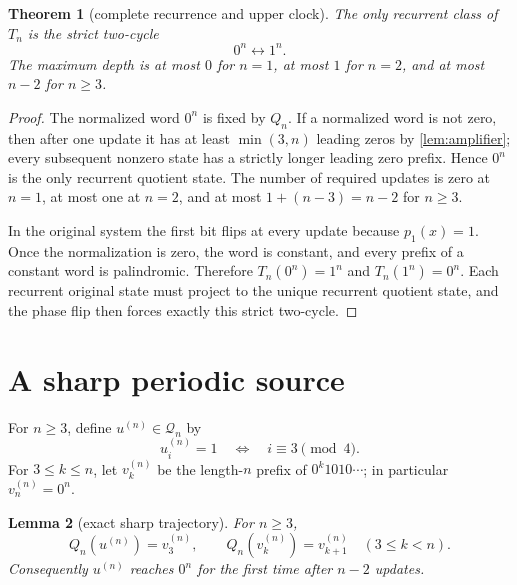 \documentclass[10pt,a4paper]{amsart}
\newtheorem{theorem}{Theorem}[section]
\newtheorem{lemma}[theorem]{Lemma}
\theoremstyle{definition}
\theoremstyle{remark}
\begin{document}
\begin{theorem}[complete recurrence and upper clock]\label{thm:recurrence}
The only recurrent class of $T_n$ is the strict two-cycle
\[
 0^n\longleftrightarrow1^n.
\]
The maximum depth is at most $0$ for $n=1$, at most $1$ for $n=2$, and at
most $n-2$ for $n\ge3$.
\end{theorem}

\begin{proof}
The normalized word $0^n$ is fixed by $Q_n$.  If a normalized word is not
zero, then after one update it has at least $\min(3,n)$ leading zeros by
\cref{lem:amplifier}; every subsequent nonzero state has a strictly longer
leading zero prefix.  Hence $0^n$ is the only recurrent quotient state.  The
number of required updates is zero at $n=1$, at most one at $n=2$, and at
most $1+(n-3)=n-2$ for $n\ge3$.

In the original system the first bit flips at every update because
$p_1(x)=1$.  Once the normalization is zero, the word is constant, and every
prefix of a constant word is palindromic.  Therefore $T_n(0^n)=1^n$ and
$T_n(1^n)=0^n$.  Each recurrent original state must project to the unique
recurrent quotient state, and the phase flip then forces exactly this strict
two-cycle.
\end{proof}

\section{A sharp periodic source}

For $n\ge3$, define $u^{(n)}\in\mathcal Q_n$ by
\begin{equation}\label{eq:witness}
 u^{(n)}_i=1\quad\Longleftrightarrow\quad i\equiv3\pmod4.
\end{equation}
For $3\le k\le n$, let $v^{(n)}_k$ be the length-$n$ prefix of
$0^k1010\cdots$; in particular $v^{(n)}_n=0^n$.

\begin{lemma}[exact sharp trajectory]\label{lem:sharp}
For $n\ge3$,
\[
 Q_n(u^{(n)})=v^{(n)}_3,
 \qquad
 Q_n(v^{(n)}_k)=v^{(n)}_{k+1}\quad(3\le k<n).
\]
Consequently $u^{(n)}$ reaches $0^n$ for the first time after $n-2$ updates.
\end{lemma}
\end{document}
